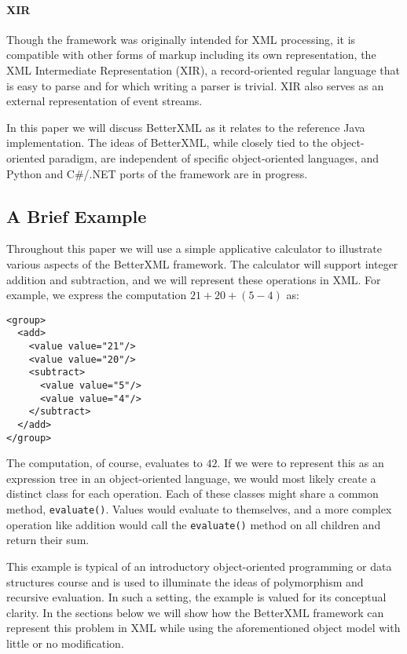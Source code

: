 \paragraph*{XIR} Though the framework was originally intended for XML
processing, it is compatible with other forms of markup including its
own representation, the XML Intermediate Representation (XIR), a
record-oriented regular language that is easy to parse and for which
writing a parser is trivial. XIR also serves as an external
representation of event streams.

In this paper we will discuss BetterXML as it relates to the reference
Java implementation. The ideas of BetterXML, while closely tied to the
object-oriented paradigm, are independent of specific object-oriented
languages, and Python and C\#/.NET ports of the framework are in
progress.

\subsection{A Brief Example}
Throughout this paper we will use a simple applicative calculator to
illustrate various aspects of the BetterXML framework.  The calculator
will support integer addition and subtraction, and we will represent
these operations in XML.  For example, we express the computation
$21+20+(5-4)$ as:

\begin{lstlisting}
<group>
  <add>
    <value value="21"/>
    <value value="20"/>
    <subtract>
      <value value="5"/>
      <value value="4"/>
    </subtract>
  </add>
</group>
\end{lstlisting}
The computation, of course, evaluates to $42$.  If we were to represent
this as an expression tree in an object-oriented language, we would
most likely create a distinct class for each operation.  Each
of these classes might share a common method, \lstinline{evaluate()}.
Values would evaluate to themselves, and a more complex operation like
addition would call the \lstinline{evaluate()} method on all children
and return their sum.

This example is typical of an introductory object-oriented programming
or data structures course and is used to illuminate the ideas of
polymorphism and recursive evaluation.  In such a setting, the example
is valued for its conceptual clarity.  In the sections below we will
show how the BetterXML framework can represent this problem in XML
while using the aforementioned object model with little or no
modification.
